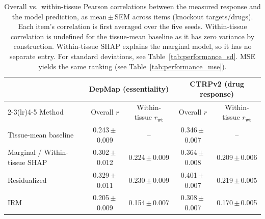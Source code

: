\begin{table}[t]
  \centering
  \small
  \begin{tabular}{l cc cc}
    \toprule
    & \multicolumn{2}{c}{DepMap (essentiality)} & \multicolumn{2}{c}{CTRPv2 (drug response)} \\
    \cmidrule(lr){2-3}\cmidrule(lr){4-5}
    Method & Overall $r$ & Within-tissue $r_{\mathrm{wt}}$ & Overall $r$ & Within-tissue $r_{\mathrm{wt}}$ \\
    \midrule
    Tissue-mean baseline & 0.243\,$\pm$\,0.009 & -- & 0.346\,$\pm$\,0.007 & -- \\
    \midrule
    Marginal / Within-tissue SHAP & 0.302\,$\pm$\,0.012 & 0.224\,$\pm$\,0.009 & 0.364\,$\pm$\,0.008 & 0.209\,$\pm$\,0.006 \\
    Residualized & 0.329\,$\pm$\,0.011 & 0.230\,$\pm$\,0.009 & 0.401\,$\pm$\,0.007 & 0.219\,$\pm$\,0.005 \\
    IRM & 0.205\,$\pm$\,0.009 & 0.154\,$\pm$\,0.007 & 0.308\,$\pm$\,0.007 & 0.170\,$\pm$\,0.005 \\
    \bottomrule
  \end{tabular}
  \caption{Overall vs.\ within-tissue Pearson correlations between the measured response and the model prediction, as mean\,$\pm$\,SEM across items (knockout targets/drugs). Each item's correlation is first averaged over the five seeds. Within-tissue correlation is undefined for the tissue-mean baseline as it has zero variance by construction. Within-tissue SHAP explains the marginal model, so it has no separate entry. For standard deviations, see Table~\ref{tab:performance_sd}. MSE yields the same ranking (see Table~\ref{tab:performance_mse}).}
  \label{tab:performance}
\end{table}
